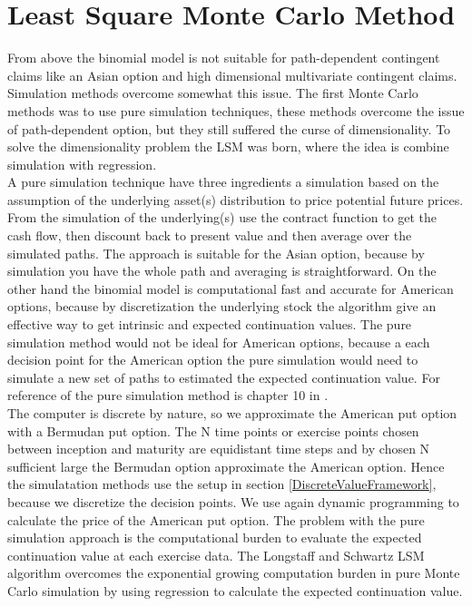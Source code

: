 \newpage

\section{Least Square Monte Carlo Method}\label{LSM}
From above the binomial model is not suitable for path-dependent contingent claims like an Asian option and high dimensional multivariate contingent claims. Simulation methods overcome somewhat this issue. The first Monte Carlo methods was to use pure simulation techniques, these methods overcome the issue of path-dependent option, but they still suffered the curse of dimensionality. To solve the dimensionality problem the LSM was born, where the idea is combine simulation with regression. \\

A pure simulation technique have three ingredients a simulation based on the assumption of the underlying asset(s) distribution to price potential future prices. From the simulation of the underlying(s) use the contract function to get the cash flow, then discount back to present value and then average over the simulated paths. The approach is suitable for the Asian option, because by simulation you have the whole path and averaging is straightforward. On the other hand the binomial model is computational fast and accurate for American options, because by discretization the underlying stock the algorithm give an effective way to get intrinsic and expected continuation values. The pure simulation method would not be ideal for American options, because a each decision point for the American option the pure simulation would need to simulate a new set of paths to estimated the expected continuation value. For reference of the pure simulation method is chapter 10 in \parencite{OVERHAUSMARCUS2007EHD}.\\ 

The computer is discrete by nature, so we approximate the American put option with a Bermudan put option. The N time points or exercise points chosen between inception and maturity are equidistant time steps and by chosen N sufficient large the Bermudan option approximate the American option. Hence the simulatation methods use the setup in section \ref{DiscreteValueFramework}, because we discretize the decision points. We use again dynamic programming to calculate the price of the American put option. The problem with the pure simulation approach is the computational burden to evaluate the expected continuation value at each exercise data. The Longstaff and Schwartz LSM algorithm overcomes the exponential growing computation burden in pure Monte Carlo simulation by using regression to calculate the expected continuation value.

